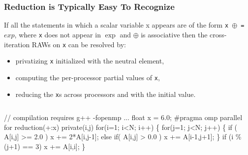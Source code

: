 \documentclass{beamer}
\renewcommand{\emph}[1]{\textcolor{structure}{#1}}
\begin{document}
\begin{frame}[fragile,t]
  \frametitle{Reduction is Typically Easy To Recognize} 

If all the statements in which a scalar variable {x} appears
are of the form {\tt x $\oplus$ = $exp$}, where {\tt x} does 
not appear in $\exp$ and $\oplus$ is associative 
then the cross-iteration RAWs on {\tt x} can be resolved by:
\begin{itemize}
    \item privatizing {\tt x} initialized with the neutral element,
    \item computing the per-processor partial values of {\tt x},
    \item reducing the {\tt x}s across processors and with the initial value.
\end  {itemize} 

\begin{columns}
\begin{colorcode}[fontsize=\scriptsize]
// compilation requires g++ -fopenmp ...
  float x = 6.0;
\#pragma omp parallel for reduction(+:x) private(i,j)
  for(i=1; i<N; i++) \{
    for(j=1; j<N; j++) \{
      if ( A[i,j] >= 2.0 )    \emph{x += 2*A[i,j-1]};
      else if( A[i,j] > 0.0 ) \emph{x += A[i-1,j+1];}
    \}
    if (i \% (j+1) == 3) \emph{x += A[i,i];}
  \}
\end{colorcode}

\end{columns}
\end{frame}
\end{document}

